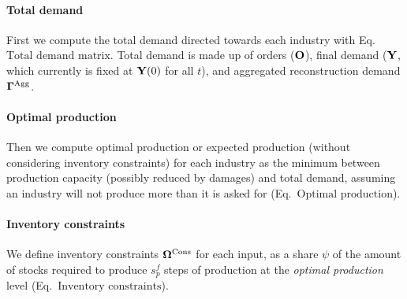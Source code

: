 \documentclass[main.tex]{subfiles}
\begin{document}
\paragraph{Total demand}
\label{sec:total-demand}

First we compute the total demand directed towards each industry with
Eq.~\(\text{Total demand matrix}\). Total demand is made up of orders
($\mathbf{O}$), final demand ($\mathbf{Y}$, which currently is fixed at $\mathbf{Y}(0)$ for
all $t$), and aggregated reconstruction demand $\mathbf{\Gamma}^{\textrm{Agg}}$.

\paragraph{Optimal production}
\label{sec:optimal-production}

Then we compute optimal production or expected production (without considering
inventory constraints) for each industry as the minimum between production
capacity (possibly reduced by damages) and total demand, assuming an industry
will not produce more than it is asked for (Eq.~\(\text{Optimal production}\)).

\paragraph{Inventory constraints}
\label{sec:invent-constr}
We define inventory constraints \(\mathbf{\Omega}^{\textrm{Cons}}\) for each input, as a
share \(\psi\) of the amount of stocks required to produce \(s_p^f\) steps of
production at the \emph{optimal production} level (Eq.~\(\text{Inventory
  constraints}\)).
\end{document}
